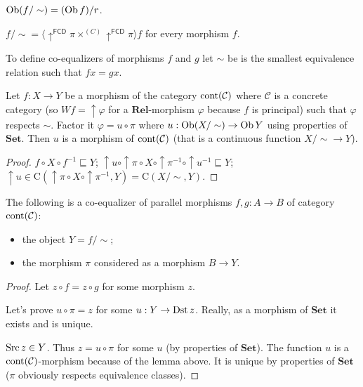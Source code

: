 \begin{obvious}
$\operatorname{Ob} (f / \sim) = (\operatorname{Ob} f) / r$.
\end{obvious}

\begin{obvious}
$f / \sim = \langle \uparrow^{\mathsf{FCD}} \pi \times^{(C)}
\uparrow^{\mathsf{FCD}} \pi \rangle f$ for every morphism
$f$.
\end{obvious}

To define co-equalizers of morphisms $f$ and $g$ let $\sim$ be is the smallest
equivalence relation such that $f x = g x$.

\begin{lem}
  Let $f : X \rightarrow Y$ be a morphism of the category
  $\operatorname{cont} (\mathcal{C})$ where $\mathcal{C}$ is a concrete
  category (so $W f = \uparrow \varphi$ for a $\mathbf{Rel}$-morphism
  $\varphi$ because $f$ is principal) such that $\varphi$ respects $\sim$.
  Factor it $\varphi = u \circ \pi$ where $u : \operatorname{Ob} (X / \sim)
  \rightarrow \operatorname{Ob} Y$ using properties of $\mathbf{Set}$. Then
  $u$ is a morphism of $\operatorname{cont} (\mathcal{C})$ (that is a
  continuous function $X / \sim \rightarrow Y$).
\end{lem}

\begin{proof}
  $f \circ X \circ f^{- 1} \sqsubseteq Y$; $\uparrow u \circ \uparrow \pi
  \circ X \circ \uparrow \pi^{- 1} \circ \uparrow u^{- 1} \sqsubseteq Y$;
  $\uparrow u \in \mathrm{C} (\uparrow \pi \circ X \circ \uparrow \pi^{- 1} ,
  Y) = \mathrm{C} (X / \sim , Y)$.
\end{proof}

\begin{thm}
  The following is a co-equalizer of parallel morphisms $f, g : A \rightarrow
  B$ of category $\operatorname{cont} (\mathcal{C})$:
  \begin{itemize}
    \item the object $Y = f / \sim$;
    
    \item the morphism $\pi$ considered as a morphism $B \rightarrow Y$.
  \end{itemize}
\end{thm}

\begin{proof}
  Let $z \circ f = z \circ g$ for some morphism $z$.
  
  Let's prove $u \circ \pi = z$ for some $u : Y \rightarrow \operatorname{Dst} z$.
  Really, as a morphism of $\mathbf{Set}$ it exists and is unique.
  
  $\operatorname{Src} z \in Y$. Thus $z = u \circ \pi$ for some $u$ (by properties of
  $\mathbf{Set}$). The function $u$ is a $\operatorname{cont}
  (\mathcal{C})$-morphism because of the lemma above. It is unique by
  properties of $\mathbf{Set}$ ($\pi$ obviously respects equivalence
  classes).
\end{proof}


